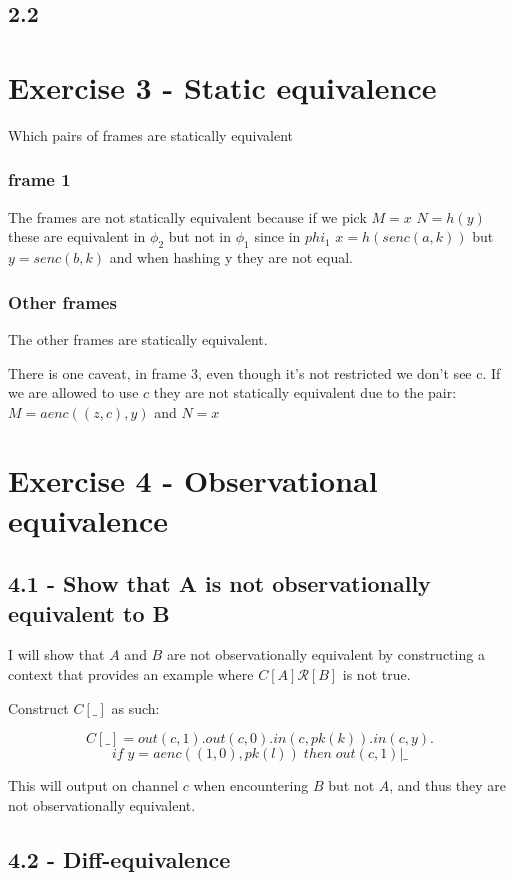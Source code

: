 \documentclass{article}
\begin{document}
\subsection*{2.2}


\section*{Exercise 3 - Static equivalence}
Which pairs of frames are statically equivalent

\subsubsection*{frame 1}
The frames are not statically equivalent because if we pick
$M = x$
$N = h(y)$
these are equivalent in $\phi_2$ but not in $\phi_1$ since in $phi_1$ $x = h(senc(a, k))$ but $y = senc(b, k)$ and when hashing y they are not equal. 

\subsubsection*{Other frames}
The other frames are statically equivalent.

There is one caveat, in frame 3, even though it's not restricted we don't see c. If we are allowed to use $c$ they are not statically equivalent due to the pair: $M = aenc((z, c), y)$ and $N = x$

\section*{Exercise 4 - Observational equivalence}

\subsection*{4.1 - Show that A is not observationally equivalent to B}

I will show that $A$ and $B$ are not observationally equivalent by constructing a context that provides an example where $C[A]\mathcal{R}[B]$ is not true.

Construct $C[\_]$ as such:

$$
C[\_] = out(c, 1).out(c, 0).in(c,pk(k)).in(c, y).
$$
$$
if \; y = aenc((1, 0), pk(l)) \; then \; out(c, 1) | \_ 
$$ 

This will output on channel $c$ when encountering $B$ but not $A$, and thus they are not observationally equivalent.

\subsection*{4.2 - Diff-equivalence}
\end{document}
